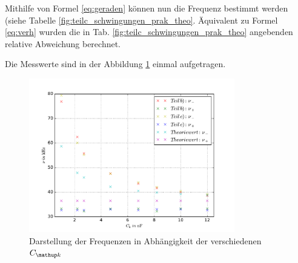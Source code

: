 Mithilfe von Formel \eqref{eq:geraden} können nun die Frequenz bestimmt werden (siehe Tabelle \ref{fig:teilc_schwingungen_prak_theo}.
Äquivalent zu Formel \eqref{eq:verh} wurden die in Tab. \ref{fig:teilc_schwingungen_prak_theo} angebenden relative Abweichung berechnet.

Die Messwerte sind in der Abbildung \ref{fig: plot} einmal aufgetragen. %
\begin{figure}
  \centering
  \includegraphics[width=0.8\textwidth]{pics/plot_frequenzen.pdf}
  \caption{Darstellung der Frequenzen in Abhängigkeit der verschiedenen $C\ua{k}$}
  \label{fig: plot}
\end{figure}
